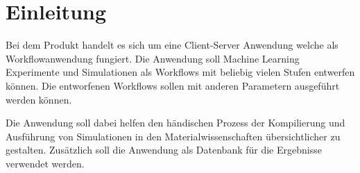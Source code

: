 \chapter{Einleitung}
Bei dem Produkt handelt es sich um eine Client-Server Anwendung welche als Workflowanwendung fungiert. Die Anwendung soll Machine Learning Experimente und Simulationen als Workflows mit beliebig vielen Stufen entwerfen können. Die entworfenen Workflows sollen mit anderen Parametern ausgeführt werden können.

Die Anwendung soll dabei helfen den händischen Prozess der Kompilierung und Ausführung von Simulationen in den Materialwissenschaften übersichtlicher zu gestalten. Zusätzlich soll die Anwendung als Datenbank für die Ergebnisse verwendet werden.

